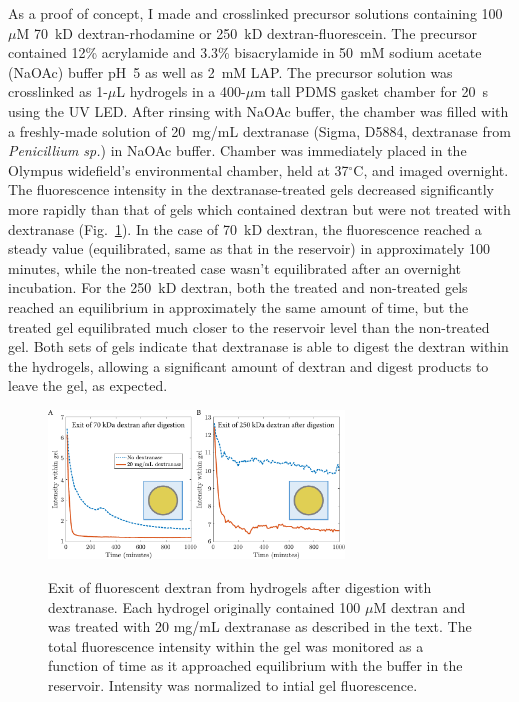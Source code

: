 As a proof of concept, I made and crosslinked precursor solutions containing 100~$\mu$M 70~kD dextran-rhodamine or 250~kD dextran-fluorescein.  The precursor contained 12\% acrylamide and 3.3\% bisacrylamide in 50~mM sodium acetate (NaOAc) buffer pH~5 as well as 2~mM LAP.  The precursor solution was crosslinked as 1-$\mu$L hydrogels in a 400-$\mu$m tall PDMS gasket chamber for 20~s using the UV LED.  After rinsing with NaOAc buffer, the chamber was filled with a freshly-made solution of 20~mg/mL dextranase (Sigma, D5884, dextranase from \textit{Penicillium sp.}) in NaOAc buffer.  Chamber was immediately placed in the Olympus widefield's environmental chamber, held at 37$^\circ$C, and imaged overnight. The fluorescence intensity in the dextranase-treated gels decreased significantly more rapidly than that of gels which contained dextran but were not treated with dextranase (Fig.~\ref{fig:dxase-equilibration}).  In the case of 70~kD dextran, the fluorescence reached a steady value (equilibrated, same as that in the reservoir) in approximately 100 minutes, while the non-treated case wasn't equilibrated after an overnight incubation.  For the 250~kD dextran, both the treated and non-treated gels reached an equilibrium in approximately the same amount of time, but the treated gel equilibrated much closer to the reservoir level than the non-treated gel.  Both sets of gels indicate that dextranase is able to digest the dextran within the hydrogels, allowing a significant amount of dextran and digest products to leave the gel, as expected.
\begin{figure}
\caption{Exit of fluorescent dextran from hydrogels after digestion with dextranase.  Each hydrogel originally contained 100 $\mu$M dextran and was treated with 20 mg/mL dextranase as described in the text.  The total fluorescence intensity within the gel was monitored as a function of time as it approached equilibrium with the buffer in the reservoir.  Intensity was normalized to intial gel fluorescence.}
\centering
\includegraphics[width=0.7\textwidth]{figs/ch03/dxase-equilibration}
\label{fig:dxase-equilibration}
\end{figure}

